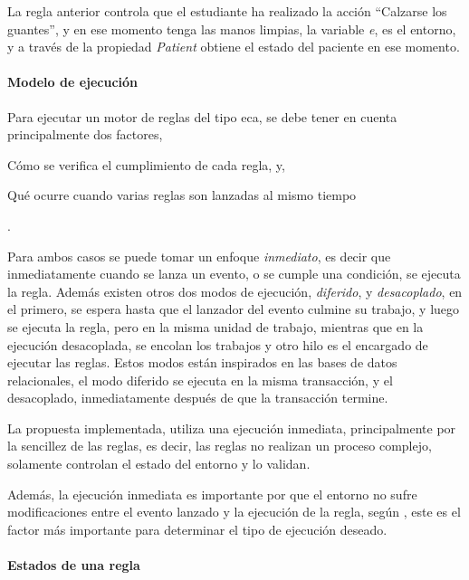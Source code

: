 La regla anterior controla que el estudiante ha realizado la acción ``Calzarse
los guantes'', y en ese momento tenga las manos limpias, la variable \emph{e},
es el entorno, y a través de la propiedad \emph{Patient} obtiene el estado del
paciente en ese momento.

\paragraph{Modelo de ejecución}

Para ejecutar un motor de reglas del tipo \gls{eca}, se debe tener en cuenta
principalmente dos factores, 
\begin{enumerate*}[label=\itshape\alph*\upshape)]
\item  Cómo se verifica el cumplimiento de cada regla, y, 
\item  Qué ocurre cuando varias reglas son lanzadas al mismo tiempo
\end{enumerate*}.

Para ambos casos se puede tomar un enfoque \emph{inmediato}, es decir que
inmediatamente cuando se lanza un evento, o se cumple una condición, se ejecuta
la regla. Además existen otros dos modos de ejecución, \emph{diferido}, y
\emph{desacoplado}, en el primero, se espera hasta que el lanzador del evento
culmine su trabajo, y luego se ejecuta la regla, pero en la misma unidad de
trabajo, mientras que en la ejecución desacoplada, se encolan los trabajos y
otro hilo es el encargado de ejecutar las reglas. Estos modos están inspirados
en las bases de datos relacionales, el modo diferido se ejecuta en la misma
transacción, y el desacoplado, inmediatamente después de que la transacción
termine\cite{bailey2004event}.

La propuesta implementada, utiliza una ejecución inmediata, principalmente por
la sencillez de las reglas, es decir, las reglas no realizan un proceso complejo,
solamente controlan el estado del entorno y lo validan.

Además, la ejecución inmediata es importante por que el entorno no sufre
modificaciones entre el evento lanzado y la ejecución de la regla, según
\cite{bailey2004event}, este es el factor más importante para determinar el tipo
de ejecución deseado.



\paragraph{Estados de una regla}

